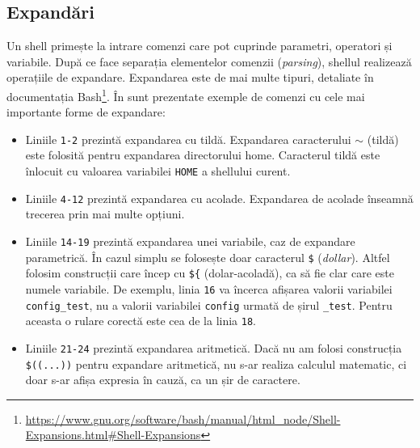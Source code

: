 
\subsection{Expandări}
\label{sec:cli:shell-func:expansion}

Un shell primește la intrare comenzi care pot cuprinde parametri, operatori și variabile. După ce face separația elementelor comenzii (\textit{parsing}), shellul realizează operațiile de expandare. Expandarea este de mai
multe tipuri, detaliate în documentația Bash\footnote{\url{https://www.gnu.org/software/bash/manual/html\_node/Shell-Expansions.html\#Shell-Expansions}}. În  sunt prezentate exemple de comenzi cu cele mai
importante forme de expandare:
\begin{itemize}
  \item Liniile \texttt{1-2} prezintă expandarea cu tildă. Expandarea caracterului \texttt{$\sim$} (tildă) este folosită pentru expandarea directorului home. Caracterul tildă este înlocuit cu valoarea variabilei \texttt{HOME} a shellului curent.
  \item Liniile \texttt{4-12} prezintă expandarea cu acolade.
Expandarea de acolade înseamnă trecerea prin mai multe opțiuni.
  \item Liniile \texttt{14-19} prezintă expandarea unei variabile, caz de expandare parametrică. În cazul simplu se folosește doar caracterul \texttt{\$} (\textit{dollar}). Altfel folosim construcții care încep cu \texttt{\$\{} (dolar-acoladă), ca să fie clar care este numele variabile.
    De exemplu, linia \texttt{16} va încerca afișarea valorii variabilei \texttt{config\_test}, nu a valorii variabilei \texttt{config} urmată de
    șirul \texttt{\_test}. Pentru aceasta o rulare corectă este cea de la linia \texttt{18}.
  \item Liniile \texttt{21-24} prezintă expandarea aritmetică. Dacă nu am folosi construcția \verb|$((...))| pentru expandare aritmetică, nu s-ar realiza calculul matematic, ci doar s-ar afișa expresia în cauză, ca un șir de caractere.
\end{itemize}

